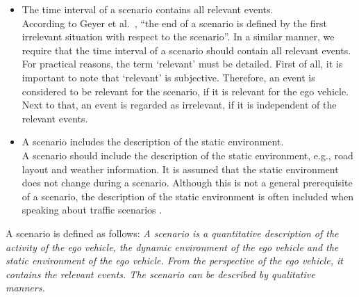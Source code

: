 \begin{itemize}
	\item The time interval of a scenario contains all relevant events. \\
	According to Geyer et al.\ \cite{geyer2014}, ``the end of a scenario is defined by the first irrelevant situation with respect to the scenario''. In a similar manner, we require that the time interval of a scenario should contain all relevant events. For practical reasons, the term `relevant' must be detailed. First of all, it is important to note that `relevant' is subjective. Therefore, an event is considered to be relevant for the scenario, if it is relevant for the ego vehicle. Next to that, an event is regarded as irrelevant, if it is independent of the relevant events.
	
	\item A scenario includes the description of the static environment. \\
	A scenario should include the description of the static environment, e.g., road layout and weather information. It is assumed that the static environment does not change during a scenario. Although this is not a general prerequisite of a scenario, the description of the static environment is often included when speaking about traffic scenarios \cite{geyer2014, ulbrich2015, elrofai2016scenario, hulshof2013autonomous, ebner2011identifying, schuldt2013effiziente}.
\end{itemize}

A scenario is defined as follows: \emph{A scenario is a quantitative description of the activity of the ego vehicle, the dynamic environment of the ego vehicle and the static environment of the ego vehicle. From the perspective of the ego vehicle, it contains the relevant events. The scenario can be described by qualitative manners.}
